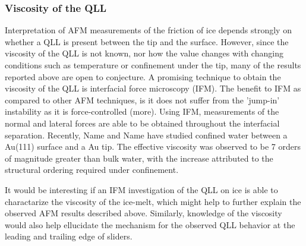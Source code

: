 \subsubsection{Viscosity of the QLL}
 Interpretation of AFM measurements of the friction of ice depends
 strongly on whether a QLL is present between the tip and the
 surface. However, since the viscosity of the QLL is not known, nor
 how the value changes with changing conditions such as temperature or
 confinement under the tip, many of the results reported above are
 open to conjecture. A promising technique to obtain the viscosity of
 the QLL is interfacial force microscopy (IFM). The benefit to IFM as
 compared to other AFM techniques, is it does not suffer from the
 'jump-in' instability as it is  force-controlled (more). Using IFM,
 measurements of the normal and lateral forces are able to be obtained
 throughout the interfacial separation.\cite{Joyce91} Recently, Name and
 Name have studied confined water between a Au(111) surface and a Au
 tip.\cite{Major06} The effective viscosity was observed to be 7 orders of
 magnitude greater than bulk water, with the increase attributed to
 the structural ordering required under confinement. 

 It would be interesting if an IFM investigation of the QLL on ice is
 able to charactarize the viscosity of the ice-melt, which might help
 to further explain the observed AFM results described
 above. Similarly, knowledge of the viscosity would also help
 ellucidate the mechanism for the observed QLL behavior at the leading
 and trailing edge of sliders.



